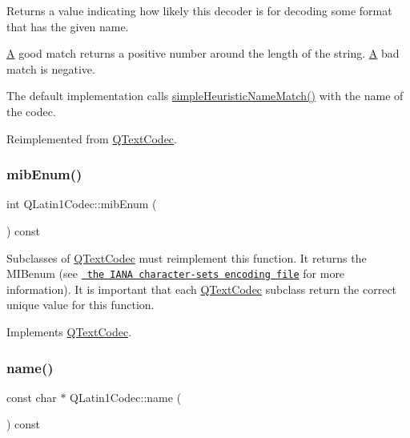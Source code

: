 Returns a value indicating how likely this decoder is for decoding some format that has the given name.

\mbox{\hyperlink{class_a}{A}} good match returns a positive number around the length of the string. \mbox{\hyperlink{class_a}{A}} bad match is negative.

The default implementation calls \mbox{\hyperlink{class_q_text_codec_a16459bb8c9e7c502547f45e5387fbb03}{simple\+Heuristic\+Name\+Match()}} with the name of the codec. 

Reimplemented from \mbox{\hyperlink{class_q_text_codec_a1bcf2f11fac6113fd6ae74dda55b2ca4}{Q\+Text\+Codec}}.

\mbox{\label{class_q_latin1_codec_a85348b77e2a1324f907a222b3a3d81d1}} 
\subsubsection{\texorpdfstring{mibEnum()}{mibEnum()}}
{\footnotesize\ttfamily int Q\+Latin1\+Codec\+::mib\+Enum (\begin{DoxyParamCaption}{ }\end{DoxyParamCaption}) const\hspace{0.3cm}{\ttfamily [virtual]}}

Subclasses of \mbox{\hyperlink{class_q_text_codec}{Q\+Text\+Codec}} must reimplement this function. It returns the M\+I\+Benum (see \href{ftp://ftp.isi.edu/in-notes/iana/assignments/character-sets}{\texttt{ the I\+A\+NA character-\/sets encoding file}} for more information). It is important that each \mbox{\hyperlink{class_q_text_codec}{Q\+Text\+Codec}} subclass return the correct unique value for this function. 

Implements \mbox{\hyperlink{class_q_text_codec_aa0118daa4f82235ae9d5bb70a168c992}{Q\+Text\+Codec}}.

\mbox{\label{class_q_latin1_codec_ae85de05cd63fcb55c7fddceeb9d524d8}} 
\subsubsection{\texorpdfstring{name()}{name()}}
{\footnotesize\ttfamily const char $\ast$ Q\+Latin1\+Codec\+::name (\begin{DoxyParamCaption}{ }\end{DoxyParamCaption}) const\hspace{0.3cm}{\ttfamily [virtual]}}

